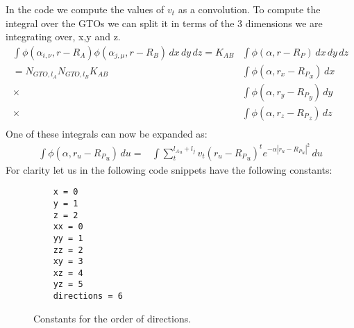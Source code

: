 In the code we compute the values of $v_t$ as a convolution. 
To compute the integral over the GTOs we can split it in terms of the 3 dimensions we are integrating over, x,y and z.
\begin{equation}
    \begin{split}
        \int \phi(\alpha_{i,\nu},r-R_A)\phi(\alpha_{j,\mu},r-R_B)\,dx\,dy\,dz=K_{AB}&\int \phi(\alpha,r-R_P)\,dx\,dy\,dz\\
        =N_{GTO,l_A}N_{GTO,l_B}K_{AB}&\int \phi(\alpha,r_x-{R_P}_x)\,dx\\
            \times&\int \phi(\alpha,r_y-{R_P}_y)\,dy\\
            \times&\int \phi(\alpha,r_z-{R_P}_z)\,dz\\
    \end{split}
\end{equation}
One of these integrals can now be expanded as:
\begin{equation}
    \begin{split}
        \int \phi(\alpha,r_u-{R_P}_u)\,du = &\int \sum_t^{{l_A}_u+l_j}v_t(r_u-{R_P}_u)^te^{-\alpha|r_u-{R_P}_u|^2}\,du
    \end{split}
\end{equation}
For clarity let us in the following code snippets have the following constants:
\begin{figure}[H]
\begin{verbatim}
    x = 0
    y = 1
    z = 2
    xx = 0
    yy = 1
    zz = 2
    xy = 3
    xz = 4
    yz = 5
    directions = 6
\end{verbatim}
\caption{Constants for the order of directions.}
\end{figure}

